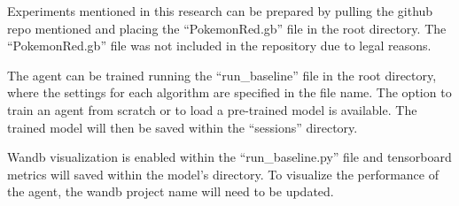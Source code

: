 Experiments mentioned in this research can be prepared by pulling the github repo mentioned and placing the ``PokemonRed.gb'' file in the root directory. The ``PokemonRed.gb'' file was not included in the repository due to legal reasons. 

The agent can be trained running the ``run\_baseline'' file in the root directory, where the settings for each algorithm are specified in the file name. The option to train an agent from scratch or to load a pre-trained model is available. The trained model will then be saved within the ``sessions'' directory.

Wandb visualization is enabled within the ``run\_baseline.py'' file and tensorboard metrics will saved within the model's directory. To visualize the performance of the agent, the wandb project name will need to be updated.
